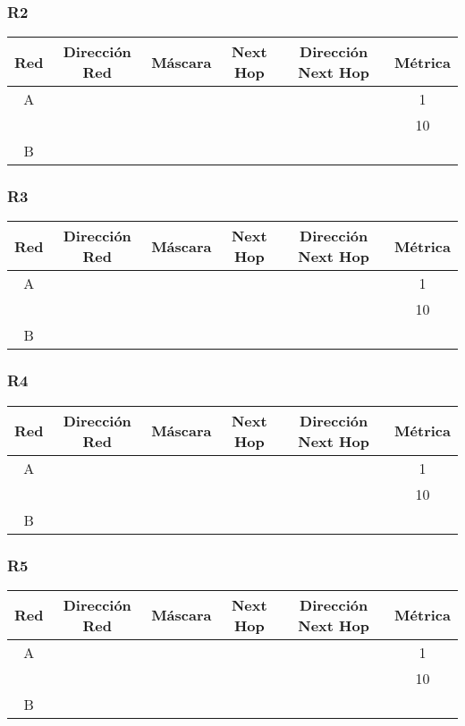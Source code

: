 \documentclass[12pt, a4paper, spanish]{article}
\begin{document}
\subsubsection{R2}
\begin{center}
\begin{tabular}{|c|c|c|c|c|c|}
	\hline
	Red & Dirección Red & Máscara & Next Hop & Dirección Next Hop & Métrica \\
	\hline
	\hline
	A &  &  &  &  & 1\\
 	  &  &  &  &  & 10 \\
	\hline	
	B & & & & &\\
	\hline
\end{tabular}
\end{center}

\subsubsection{R3}
\begin{center}
\begin{tabular}{|c|c|c|c|c|c|}
	\hline
	Red & Dirección Red & Máscara & Next Hop & Dirección Next Hop & Métrica \\
	\hline
	\hline
	A &  &  &  &  & 1\\
 	  &  &  &  &  & 10 \\
	\hline	
	B & & & & &\\
	\hline
\end{tabular}
\end{center}

\subsubsection{R4}
\begin{center}
\begin{tabular}{|c|c|c|c|c|c|}
	\hline
	Red & Dirección Red & Máscara & Next Hop & Dirección Next Hop & Métrica \\
	\hline
	\hline
	A &  &  &  &  & 1\\
 	  &  &  &  &  & 10 \\
	\hline	
	B & & & & &\\
	\hline
\end{tabular}
\end{center}

\subsubsection{R5}
\begin{center}
\begin{tabular}{|c|c|c|c|c|c|}
	\hline
	Red & Dirección Red & Máscara & Next Hop & Dirección Next Hop & Métrica \\
	\hline
	\hline
	A &  &  &  &  & 1\\
 	  &  &  &  &  & 10 \\
	\hline	
	B & & & & &\\
	\hline
\end{tabular}
\end{center}
\end{document}

